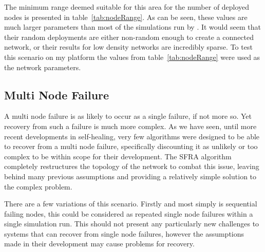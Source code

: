 \documentclass[authoryearcitations]{UoYCSproject}
\begin{document}
\begin{table}[]
\centering
{}
\caption{Minimum ranges for number of randomly deployed nodes in a 1000x1000 unit area.}
\label{tab:nodeRange}
\end{table}

The minimum range deemed suitable for this area for the number of deployed nodes is presented in table~\ref{tab:nodeRange}. As can be seen, these values are much larger parameters than most of the simulations run by \citeauthor*{Younis2010}. It would seem that their random deployments are either non-random enough to create a connected network, or their results for low density networks are incredibly sparse. To test this scenario on my platform the values from table~\ref{tab:nodeRange} were used as the network parameters.

\subsection{Multi Node Failure}

A multi node failure is as likely to occur as a single failure, if not more so. Yet recovery from such a failure is much more complex. As we have seen, until more recent developments in self-healing, very few algorithms were designed to be able to recover from a multi node failure, specifically discounting it as unlikely or too complex to be within scope for their development. The SFRA algorithm completely restructures the topology of the network to combat this issue, leaving behind many previous assumptions and providing a relatively simple solution to the complex problem.

There are a few variations of this scenario. Firstly and most simply is sequential failing nodes, this could be considered as repeated single node failures within a single simulation run. This should not present any particularly new challenges to systems that can recover from single node failures, however the assumptions made in their development may cause problems for recovery.
\end{document}
